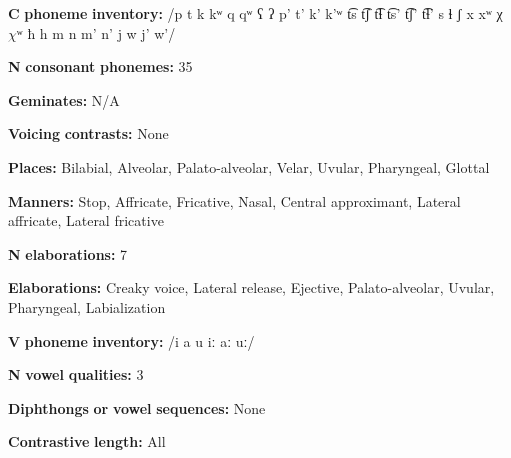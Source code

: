 \documentclass[output=paper]{langsci/langscibook}
\begin{document}
\begin{styleBody}
\textbf{C} \textbf{phoneme} \textbf{inventory:} /p t k kʷ q qʷ ʕ ʔ p’ t’ k’ k’ʷ t͡s t͡ʃ t͡ɬ t͡s’ t͡ʃ’ t͡ɬ’ s ɬ ʃ x xʷ χ $\chi ʷ$ ħ h m n m’ n’ j w j’ w’/
\end{styleBody}

\begin{styleBody}
\textbf{N} \textbf{consonant} \textbf{phonemes:} 35
\end{styleBody}

\begin{styleBody}
\textbf{Geminates:} N/A
\end{styleBody}

\begin{styleBody}
\textbf{Voicing} \textbf{contrasts:} None
\end{styleBody}

\begin{styleBody}
\textbf{Places:} Bilabial, Alveolar, Palato-alveolar, Velar, Uvular, Pharyngeal, Glottal
\end{styleBody}

\begin{styleBody}
\textbf{Manners:} Stop, Affricate, Fricative, Nasal, Central approximant, Lateral affricate, Lateral fricative
\end{styleBody}

\begin{styleBody}
\textbf{N} \textbf{elaborations:} 7
\end{styleBody}

\begin{styleBody}
\textbf{Elaborations:} Creaky voice, Lateral release, Ejective, Palato-alveolar, Uvular, Pharyngeal, Labialization
\end{styleBody}

\begin{styleBody}
\textbf{V} \textbf{phoneme} \textbf{inventory:} /i a u iː aː uː/
\end{styleBody}

\begin{styleBody}
\textbf{N} \textbf{vowel} \textbf{qualities:} 3
\end{styleBody}

\begin{styleBody}
\textbf{Diphthongs} \textbf{or} \textbf{vowel} \textbf{sequences:} None
\end{styleBody}

\begin{styleBody}
\textbf{Contrastive} \textbf{length:} All
\end{styleBody}
\end{document}
